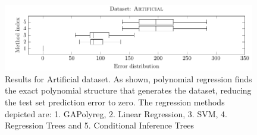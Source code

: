 \documentclass[preprint,authoryear,12pt]{elsarticle}
\begin{document}
\begin{figure}[tb]\begin{center}
\includegraphics[width=0.98\textwidth]{figure_2.pdf}

\caption{Results for Artificial dataset. As shown, polynomial regression finds the exact polynomial structure that generates the dataset, reducing the test set prediction error to zero.  The regression methods depicted are: 1. \ac{GAPolyreg}, 2. Linear Regression, 3. SVM, 4. Regression Trees and 5. Conditional Inference Trees}
\label{artificial_dataset1_lambda1.0}

\end{center}\end{figure}
\end{document}
